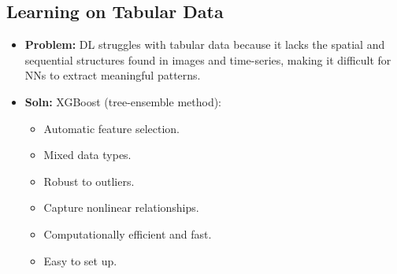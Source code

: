 \subsection{Learning on Tabular Data}
\begin{notes}
    \begin{itemize}
        \item \textbf{Problem:} DL struggles with tabular data because it lacks the spatial and sequential structures found in images and time-series, making it difficult for NNs to extract meaningful patterns. 
        \item \textbf{Soln:} XGBoost (tree-ensemble method):
        \begin{itemize}
            \item Automatic feature selection.
            \item Mixed data types.
            \item Robust to outliers.
            \item Capture nonlinear relationships.
            \item Computationally efficient and fast.
            \item Easy to set up.
        \end{itemize}
    \end{itemize}
\end{notes} 

